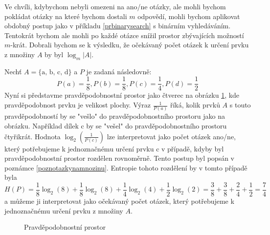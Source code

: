 \begin{prikl}[m odpovědí]\label{prmodpovedi}
    Ve chvíli, kdybychom nebyli omezeni na ano/ne otázky, ale mohli bychom pokládat otázky na které bychom dostali $m$ odpovědí, mohli bychom aplikovat obdobný postup jako v příkladu \ref{prbinarysearch} s binárním vyhledáváním. Tentokrát bychom ale mohli po každé otázce snížil prostor zbývajících možností $m$-krát. Dobrali bychom se k výsledku, že očekávaný počet otázek k určení prvku z množiny $A$ by byl $\log_m |A|$.
\end{prikl}

\begin{prikl}\label{prentropierozdeleni}
Nechť $A = \{ \text{a, b, c, d}\}$ a $P$ je zadaná následovně: 
\[P(a) = \frac{1}{8}, P(b) = \frac{1}{8}, P(c) = \frac{1}{4}, P(d) = \frac{1}{2}\]
Nyní si představme pravděpodobnostní prostor jako čtverec na obrázku \ref{prprostor}, kde pravděpodobnost prvku je velikost plochy. Výraz $\frac{1}{P(a)}$ říká, kolik prvků $A$ s touto pravděpodobností by se "vešlo" do pravděpodobnostního prostoru jako na obrázku. Například dílek c by se "vešel" do pravděpodobnostního prostoru čtyřikrát.
Hodnota $\log_2\left(\frac{1}{P(c)}\right)$ lze interpretovat jako počet otázek ano/ne, který potřebujeme k jednoznačnému určení prvku c v případě, kdyby byl pravděpodobnostní prostor rozdělen rovnoměrně. Tento postup byl popsán 
v poznámce \ref{poznotazkynamnozinu}.
Entropie tohoto rozdělení by v tomto případě byla 
\[H(P) = \frac{1}{8}\log_2 (8) + \frac{1}{8}\log_2 (8) + \frac{1}{4}\log_2 (4) + \frac{1}{2}\log_2 (2) = \frac{3}{8} + \frac{3}{8} + \frac{2}{4} + \frac{1}{2} = \frac{7}{4}\]
a můžeme ji interpretovat jako očekávaný počet otázek, který potřebujeme k jednoznačnému určení prvku z množiny $A$. 


\begin{figure}
\caption{Pravděpodobnostní prostor}
\label{prprostor}
\end{figure}

\end{prikl}

